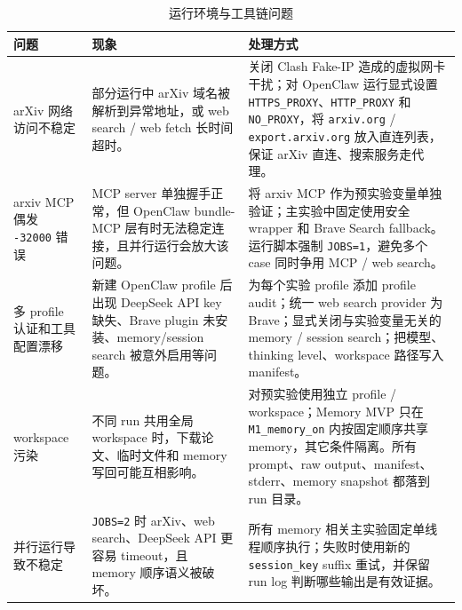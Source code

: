 \documentclass[UTF8,fontset=fandol,a4paper,12pt]{ctexart}
\begin{document}
\begin{table}[htbp]
  \centering
  \small
  \caption{运行环境与工具链问题}
  \begin{tabularx}{\textwidth}{@{}p{2.8cm}XX@{}}
    \toprule
    问题 & 现象 & 处理方式 \\
    \midrule
    arXiv 网络访问不稳定 &
    部分运行中 arXiv 域名被解析到异常地址，或 web search / web fetch 长时间超时。 &
    关闭 Clash Fake-IP 造成的虚拟网卡干扰；对 OpenClaw 运行显式设置 \texttt{HTTPS\_PROXY}、\texttt{HTTP\_PROXY} 和 \texttt{NO\_PROXY}，将 \texttt{arxiv.org} / \texttt{export.arxiv.org} 放入直连列表，保证 arXiv 直连、搜索服务走代理。 \\
    \addlinespace
    arxiv MCP 偶发 \texttt{-32000} 错误 &
    MCP server 单独握手正常，但 OpenClaw bundle-MCP 层有时无法稳定连接，且并行运行会放大该问题。 &
    将 arxiv MCP 作为预实验变量单独验证；主实验中固定使用安全 wrapper 和 Brave Search fallback。运行脚本强制 \texttt{JOBS=1}，避免多个 case 同时争用 MCP / web search。 \\
    \addlinespace
    多 profile 认证和工具配置漂移 &
    新建 OpenClaw profile 后出现 DeepSeek API key 缺失、Brave plugin 未安装、memory/session search 被意外启用等问题。 &
    为每个实验 profile 添加 profile audit；统一 web search provider 为 Brave；显式关闭与实验变量无关的 memory / session search；把模型、thinking level、workspace 路径写入 manifest。 \\
    \addlinespace
    workspace 污染 &
    不同 run 共用全局 workspace 时，下载论文、临时文件和 memory 写回可能互相影响。 &
    对预实验使用独立 profile / workspace；Memory MVP 只在 \texttt{M1\_memory\_on} 内按固定顺序共享 memory，其它条件隔离。所有 prompt、raw output、manifest、stderr、memory snapshot 都落到 run 目录。 \\
    \addlinespace
    并行运行导致不稳定 &
    \texttt{JOBS=2} 时 arXiv、web search、DeepSeek API 更容易 timeout，且 memory 顺序语义被破坏。 &
    所有 memory 相关主实验固定单线程顺序执行；失败时使用新的 \texttt{session\_key} suffix 重试，并保留 run log 判断哪些输出是有效证据。 \\
    \bottomrule
  \end{tabularx}
\end{table}
\end{document}
